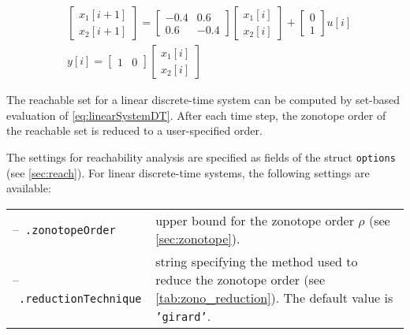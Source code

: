 \begin{center}
\begin{minipage}[t]{0.55\textwidth}
	\vspace{10pt}
	\begin{equation*}
\begin{split}
	& \begin{bmatrix} x_1[i+1] \\ x_2[i+1] \end{bmatrix} = \begin{bmatrix} -0.4 & 0.6 \\ 0.6 & -0.4 \end{bmatrix} \begin{bmatrix} x_1[i] \\ x_2[i] \end{bmatrix} + \begin{bmatrix} 0 \\ 1 \end{bmatrix} u[i] \\
	& y[i] = \begin{bmatrix} 1 & 0 \end{bmatrix} \begin{bmatrix} x_1[i] \\ x_2[i] \end{bmatrix} 
\end{split}
\end{equation*}
\end{minipage}
\begin{minipage}[t]{0.40\textwidth}
	\footnotesize
	
\end{minipage}
\end{center}




The reachable set for a linear discrete-time system can be computed by set-based evaluation of \eqref{eq:linearSystemDT}. After each time step, the zonotope order of the reachable set is reduced to a user-specified order.

The settings for reachability analysis are specified as fields of the struct \texttt{options} (see \cref{sec:reach}). For linear discrete-time systems, the following settings are available:

\begin{center}
\renewcommand{\arraystretch}{1.3}
\begin{tabular}[t]{l p{11cm}}	
	--~\texttt{.zonotopeOrder} & upper bound for the zonotope order $\rho$ (see \cref{sec:zonotope}). \\
	--~\texttt{.reductionTechnique} & string specifying the method used to reduce the zonotope order (see \cref{tab:zono_reduction}). The default value is \texttt{'girard'}.
\end{tabular}
\end{center}



